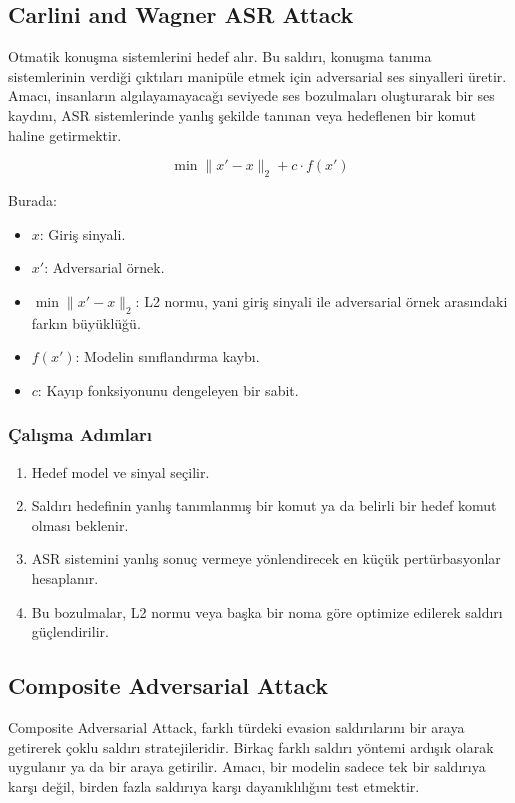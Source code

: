 \subsection{Carlini and Wagner ASR Attack}

Otmatik konuşma sistemlerini hedef alır. Bu saldırı, konuşma tanıma sistemlerinin verdiği çıktıları manipüle etmek için adversarial ses sinyalleri üretir. Amacı, insanların algılayamayacağı seviyede ses bozulmaları oluşturarak bir ses kaydını, ASR sistemlerinde yanlış şekilde tanınan veya hedeflenen bir komut haline getirmektir.

\[ \min \|x' - x\|_2 + c \cdot f(x') \]

Burada:

\begin{itemize}
    \item $x$: Giriş sinyali.
    \item $x'$: Adversarial örnek.
    \item $\min \|x' - x\|_2$: L2 normu, yani giriş sinyali ile adversarial örnek arasındaki farkın büyüklüğü.
    \item $f(x')$: Modelin sınıflandırma kaybı.
    \item $c$: Kayıp fonksiyonunu dengeleyen bir sabit.
\end{itemize}

\subsubsection{Çalışma Adımları}

\begin{enumerate}
    \item Hedef model ve sinyal seçilir.
    \item Saldırı hedefinin yanlış tanımlanmış bir komut ya da belirli bir hedef komut olması beklenir.
    \item ASR sistemini yanlış sonuç vermeye yönlendirecek en küçük pertürbasyonlar hesaplanır.
    \item Bu bozulmalar, L2 normu veya başka bir noma göre optimize edilerek saldırı güçlendirilir.
\end{enumerate}

\newpage

\subsection{Composite Adversarial Attack}

Composite Adversarial Attack, farklı türdeki evasion saldırılarını bir araya getirerek çoklu saldırı stratejileridir. Birkaç farklı saldırı yöntemi ardışık olarak uygulanır ya da bir araya getirilir. Amacı, bir modelin sadece tek bir saldırıya karşı değil, birden fazla saldırıya karşı dayanıklılığını test etmektir. 

